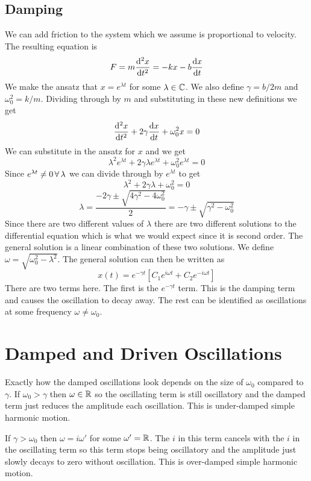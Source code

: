 \documentclass{article}
\begin{document}
    \subsection{Damping}
    We can add friction to the system which we assume is proportional to velocity.
    The resulting equation is
    \[F = m\dv[2]{x}{t} = -kx - b\dv{x}{t}\]
    We make the ansatz that \(x = e^{\lambda t}\) for some \(\lambda\in\mathbb{C}\). We also define \(\gamma = b/2m\) and \(\omega_0^2 = k/m\).
    Dividing through by \(m\) and substituting in these new definitions we get
    \[\dv[2]{x}{t} + 2\gamma\dv{x}{t} + \omega_0^2 x = 0\]
    We can substitute in the ansatz for \(x\) and we get
    \[\lambda^2e^{\lambda t} + 2\gamma\lambda e^{\lambda t} + \omega_0^2e^{\lambda t} = 0\]
    Since \(e^{\lambda t}\ne 0\,\forall\,\lambda\) we can divide through by \(e^{\lambda t}\) to get
    \[\lambda^2 + 2\gamma\lambda + \omega_0^2 = 0\]
    \[\lambda = \frac{-2\gamma \pm \sqrt{4\gamma^2 - 4\omega_0^2}}{2} = -\gamma \pm \sqrt{\gamma^2 - \omega_0^2}\]
    Since there are two different values of \(\lambda\) there are two different solutions to the differential equation which is what we would expect since it is second order.
    The general solution is a linear combination of these two solutions.
    We define \(\omega = \sqrt{\omega_0^2 - \lambda^2}\).
    The general solution can then be written as
    \[x(t) = e^{-\gamma t}\left[C_1e^{i\omega t} + C_2e^{-i\omega t}\right]\]
    There are two terms here.
    The first is the \(e^{-\gamma t}\) term.
    This is the damping term and causes the oscillation to decay away.
    The rest can be identified as oscillations at some frequency \(\omega \ne \omega_0\).
    \section{Damped and Driven Oscillations}
    Exactly how the damped oscillations look depends on the size of \(\omega_0\) compared to \(\gamma\).
    If \(\omega _0 > \gamma\) then \(\omega\in\mathbb{R}\) so the oscillating term is still oscillatory and the damped term just reduces the amplitude each oscillation.
    This is under-damped simple harmonic motion.
    
    If \(\gamma > \omega_0\) then \(\omega = i\omega'\) for some \(\omega' = \mathbb{R}\).
    The \(i\) in this term cancels with the \(i\) in the oscillating term so this term stops being oscillatory and the amplitude just slowly decays to zero without oscillation.
    This is over-damped simple harmonic motion.
    
\end{document}
